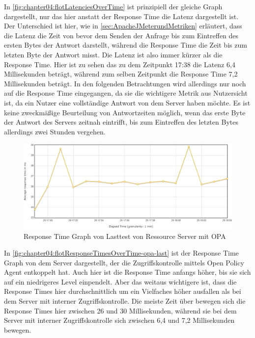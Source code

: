 In \autoref{fig:chapter04:flotLatenciesOverTime} ist prinzipiell der gleiche Graph dargestellt, nur das hier anstatt der Response Time die Latenz dargestellt ist. Der Unterschied ist hier, wie in \autoref{sec:ApacheJMeterundMetriken} erläutert, dass die Latenz die Zeit von bevor dem Senden der Anfrage bis zum Eintreffen des ersten Bytes der Antwort darstellt, während die Response Time die Zeit bis zum letzten Byte der Antwort misst. Die Latenz ist also immer kürzer als die Response Time. Hier ist zu sehen das zu dem Zeitpunkt 17:38 die Latenz 6,4 Millisekunden beträgt, während zum selben Zeitpunkt die Response Time 7,2 Millisekunden beträgt. In den folgenden Betrachtungen wird allerdings nur noch auf die Response Time eingegangen, da sie die wichtigere Metrik aus Nutzersicht ist, da ein Nutzer eine vollständige Antwort von dem Server haben möchte. Es ist keine zweckmäßige Beurteilung von Antwortzeiten möglich, wenn das erste Byte der Antwort des Servers zeitnah eintrifft, bis zum Eintreffen des letzten Bytes allerdings zwei Stunden vergehen. 

\begin{figure}[H]
  \centering
  \includegraphics[width=1.0\textwidth]{gfx/flotResponseTimesOverTime-opa-last.png}
  \caption{Response Time Graph von Lasttest von Ressource Server mit OPA}
  \label{fig:chapter04:flotResponseTimesOverTime-opa-last}
\end{figure}

In \autoref{fig:chapter04:flotResponseTimesOverTime-opa-last} ist der Response Time Graph von dem Server dargestellt, der die Zugriffskontrolle mittels Open Policy Agent entkoppelt hat. Auch hier ist die Response Time anfangs höher, bis sie sich auf ein niedrigeres Level einpendelt. Aber das weitaus wichtigere ist, dass die Response Times hier durchschnittlich um ein Vielfaches höher ausfallen als bei dem Server mit interner Zugriffskontrolle. Die meiste Zeit über bewegen sich die Response Times hier zwischen 26 und 30 Millisekunden, während sie bei dem Server mit interner Zugriffskontrolle sich zwischen 6,4 und 7,2 Millisekunden bewegen.\smallskip

